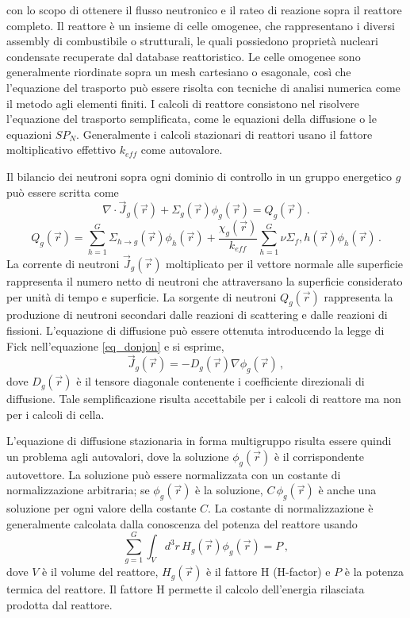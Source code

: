 con lo scopo di ottenere il flusso neutronico e il rateo di reazione sopra il 
reattore completo. Il reattore è un insieme di celle omogenee, che 
rappresentano 
i diversi assembly di combustibile o strutturali, le quali possiedono proprietà 
nucleari condensate recuperate dal database reattoristico.
Le celle omogenee sono generalmente riordinate sopra un mesh cartesiano o 
esagonale, così che l'equazione del trasporto può essere risolta con tecniche 
di 
analisi numerica come il metodo agli elementi finiti.
I calcoli di reattore consistono nel risolvere l'equazione del trasporto 
semplificata, come le equazioni della diffusione o le equazioni $SP_N$. 
Generalmente i calcoli stazionari di reattori usano il fattore 
moltiplicativo effettivo $k_{eff}$ come autovalore. 

Il bilancio dei neutroni sopra ogni dominio di controllo in un gruppo 
energetico 
$g$ può essere scritta come 
\begin{equation}
\label{eq_donjon}
\nabla \cdot \vec{J}_g(\vec{r})+\Sigma_g(\vec{r})\phi_g(\vec{r})=Q_g(\vec{r})\,.
\end{equation}
\begin{equation}
Q_g(\vec{r})=\sum_{h=1}^G \Sigma_{h \rightarrow g}(\vec{r}) 
\phi_h(\vec{r})+\frac{\chi_g(\vec{r})}{k_{eff}} \sum_{h=1}^G \nu 
\Sigma_f,h(\vec{r})\phi_h(\vec{r})   \,.
\end{equation}
La corrente di neutroni $\vec{J}_g(\vec{r})$ moltiplicato per il vettore 
normale 
alle superficie rappresenta il numero netto di neutroni che attraversano la 
superficie considerato per unità di tempo e superficie.
La sorgente di neutroni $Q_g(\vec{r})$ rappresenta la produzione di neutroni 
secondari dalle reazioni di scattering e dalle reazioni di fissioni.
L'equazione di diffusione può essere ottenuta introducendo la legge di Fick 
nell'equazione \eqref{eq_donjon} e si esprime,
\begin{equation}
\vec{J}_g(\vec{r})= -D_g(\vec{r})\nabla \phi_g(\vec{r}) \,,
\end{equation}
dove $D_g(\vec{r})$ è il tensore diagonale contenente i coefficiente 
direzionali 
di diffusione.
Tale semplificazione risulta accettabile per i calcoli di reattore ma non per i 
calcoli di cella.

L'equazione di diffusione stazionaria in forma multigruppo risulta essere 
quindi 
un problema agli autovalori, dove la soluzione $\phi_g(\vec{r})$ è il 
corrispondente autovettore. La soluzione può essere normalizzata con un 
costante 
di normalizzazione arbitraria; se $\phi_g(\vec{r})$ è la soluzione, $C 
\,\phi_g(\vec{r})$ è anche una soluzione per ogni valore della costante $C$. La 
costante di normalizzazione è generalmente calcolata dalla conoscenza del 
potenza del reattore usando 
\begin{equation}
\sum_{g=1}^G \int_V d^3r \,H_g(\vec{r})\phi_g(\vec{r}) = P \,,
\end{equation}
dove $V$ è il volume del reattore, $H_g(\vec{r})$ è il fattore H (H-factor) e 
$P$ è la potenza termica del reattore. Il fattore H permette il calcolo 
dell'energia rilasciata prodotta dal reattore.

